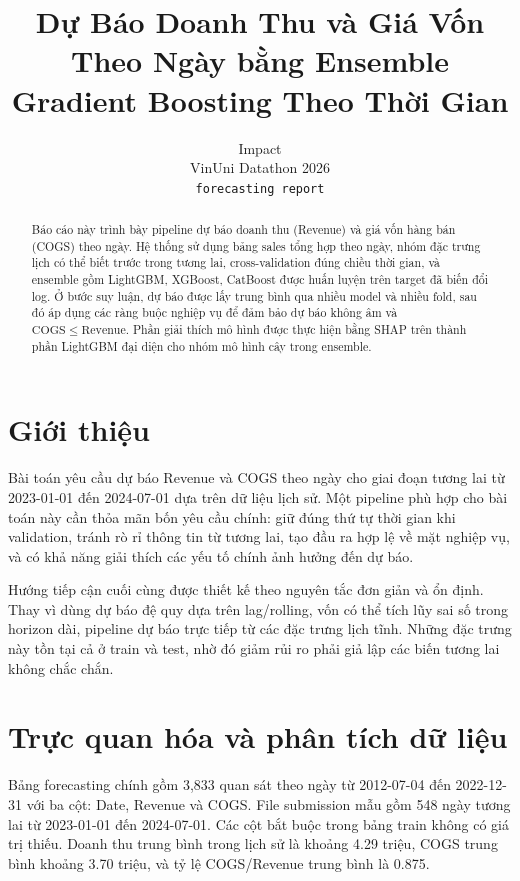 ﻿\documentclass{article}
\title{Dự Báo Doanh Thu và Giá Vốn Theo Ngày bằng Ensemble Gradient Boosting Theo Thời Gian}
\author{%
  Impact\\
  VinUni Datathon 2026\\
  \texttt{forecasting report}
}
\begin{document}
\maketitle

\begin{abstract}
Báo cáo này trình bày pipeline dự báo doanh thu (Revenue) và giá vốn hàng bán (COGS) theo ngày. Hệ thống sử dụng bảng sales tổng hợp theo ngày, nhóm đặc trưng lịch có thể biết trước trong tương lai, cross-validation đúng chiều thời gian, và ensemble gồm LightGBM, XGBoost, CatBoost được huấn luyện trên target đã biến đổi log. Ở bước suy luận, dự báo được lấy trung bình qua nhiều model và nhiều fold, sau đó áp dụng các ràng buộc nghiệp vụ để đảm bảo dự báo không âm và \(\mathrm{COGS} \leq \mathrm{Revenue}\). Phần giải thích mô hình được thực hiện bằng SHAP trên thành phần LightGBM đại diện cho nhóm mô hình cây trong ensemble.
\end{abstract}

\section{Giới thiệu}
Bài toán yêu cầu dự báo Revenue và COGS theo ngày cho giai đoạn tương lai từ 2023-01-01 đến 2024-07-01 dựa trên dữ liệu lịch sử. Một pipeline phù hợp cho bài toán này cần thỏa mãn bốn yêu cầu chính: giữ đúng thứ tự thời gian khi validation, tránh rò rỉ thông tin từ tương lai, tạo đầu ra hợp lệ về mặt nghiệp vụ, và có khả năng giải thích các yếu tố chính ảnh hưởng đến dự báo.

Hướng tiếp cận cuối cùng được thiết kế theo nguyên tắc đơn giản và ổn định. Thay vì dùng dự báo đệ quy dựa trên lag/rolling, vốn có thể tích lũy sai số trong horizon dài, pipeline dự báo trực tiếp từ các đặc trưng lịch tĩnh. Những đặc trưng này tồn tại cả ở train và test, nhờ đó giảm rủi ro phải giả lập các biến tương lai không chắc chắn.

\section{Trực quan hóa và phân tích dữ liệu}
Bảng forecasting chính gồm 3,833 quan sát theo ngày từ 2012-07-04 đến 2022-12-31 với ba cột: Date, Revenue và COGS. File submission mẫu gồm 548 ngày tương lai từ 2023-01-01 đến 2024-07-01. Các cột bắt buộc trong bảng train không có giá trị thiếu. Doanh thu trung bình trong lịch sử là khoảng 4.29 triệu, COGS trung bình khoảng 3.70 triệu, và tỷ lệ COGS/Revenue trung bình là 0.875.
\end{document}
